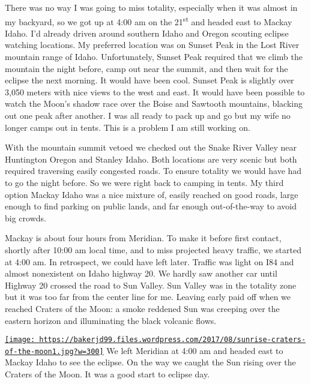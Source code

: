 There was no way I was going to miss totality, especially when it was
almost in my backyard, so we got up at 4:00 am on the
21\textsuperscript{st} and headed east to Mackay Idaho. I'd already
driven around southern Idaho and Oregon scouting eclipse watching
locations. My preferred location was on Sunset Peak in the Lost River
mountain range of Idaho. Unfortunately, Sunset Peak required that we
climb the mountain the night before, camp out near the summit, and then
wait for the eclipse the next morning. It would have been cool. Sunset
Peak is slightly over 3,050 meters with nice views to the west and east.
It would have been possible to watch the Moon's shadow race over the
Boise and Sawtooth mountains, blacking out one peak after another. I was
all ready to pack up and go but my wife no longer camps out in tents.
This is a problem I am still working on.

With the mountain summit vetoed we checked out the Snake River Valley
near Huntington Oregon and Stanley Idaho. Both locations are very scenic
but both required traversing easily congested roads. To ensure totality
we would have had to go the night before. So we were right back to
camping in tents. My third option Mackay Idaho was a nice mixture of,
easily reached on good roads, large enough to find parking on public
lands, and far enough out-of-the-way to avoid big crowds.

Mackay is about four hours from Meridian. To make it before first
contact, shortly after 10:00 am local time, and to miss projected heavy
traffic, we started at 4:00 am. In retrospect, we could have left later.
Traffic was light on I84 and almost nonexistent on Idaho highway 20. We
hardly saw another car until Highway 20 crossed the road to Sun Valley.
Sun Valley was in the totality zone but it was too far from the center
line for me. Leaving early paid off when we reached Craters of the Moon:
a smoke reddened Sun was creeping over the eastern horizon and
illuminating the black volcanic flows.


\href{https://conceptcontrol.smugmug.com/Places/USA-and-Canada/Idaho-Instants/i-mXNChFm/A}{\texttt{[image: https://bakerjd99.files.wordpress.com/2017/08/sunrise-craters-of-the-moon1.jpg?w=300]}}
We left Meridian at 4:00 am and headed east to Mackay Idaho to see the
eclipse. On the way we caught the Sun rising over the Craters of the
Moon. It was a good start to eclipse day.


